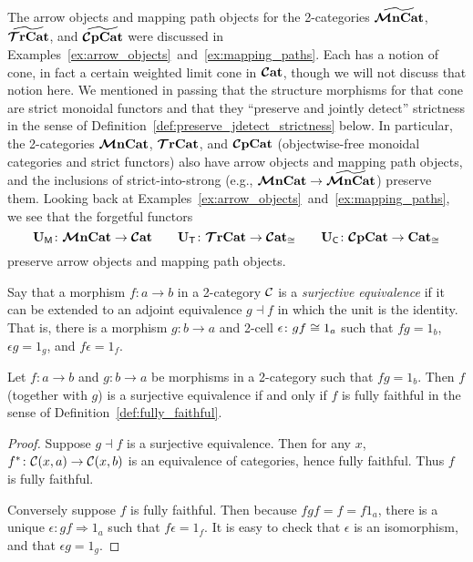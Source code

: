 \documentclass[11pt,oneside,article]{memoir}
\begin{document}
\begin{remark}
      \label{rem:pres_joint_detect}
   The arrow objects and mapping path objects for the 2-categories $\widetilde{\bm{\mathcal{M}}\mathbf{nCat}}$,
   $\widetilde{\bm{\mathcal{T}}\mathbf{rCat}}$, and $\widetilde{\bm{\mathcal{C}}\mathbf{pCat}}$ were discussed in
   Examples~\ref{ex:arrow_objects}~and~\ref{ex:mapping_paths}. Each has a notion of cone, in fact a
   certain weighted limit cone in $\bm{\mathcal{C}}\mathbf{at}$, though we will not discuss that notion here. We mentioned
   in passing that the structure morphisms for that cone are strict monoidal functors and that they
   ``preserve and jointly detect'' strictness in the sense of
   Definition~\ref{def:preserve_jdetect_strictness} below. In particular, the 2-categories
   $\bm{\mathcal{M}}\mathbf{nCat}$, $\bm{\mathcal{T}}\mathbf{rCat}$, and $\bm{\mathcal{C}}\mathbf{pCat}$ (objectwise-free monoidal categories and strict functors) also have arrow objects and mapping path objects, and the
   inclusions of strict-into-strong (e.g., $\bm{\mathcal{M}}\mathbf{nCat}\to\widetilde{\bm{\mathcal{M}}\mathbf{nCat}}$) preserve them. Looking back
   at Examples~\ref{ex:arrow_objects}~and~\ref{ex:mapping_paths}, we see that the forgetful functors
   \[
      \mathbf{U}_{\mathsf{M}}\colon\bm{\mathcal{M}}\mathbf{nCat}\to\bm{\mathcal{C}}\mathbf{at}
         \qquad
      \mathbf{U}_{\mathsf{T}}\colon\bm{\mathcal{T}}\mathbf{rCat}\to\bm{\mathcal{C}}\mathbf{at}_{\cong}
         \qquad
      \mathbf{U}_{\mathsf{C}}\colon\bm{\mathcal{C}}\mathbf{pCat}\to\mathbf{Cat}_{\cong}
   \]
   preserve arrow objects and mapping path objects.
\end{remark}

\begin{definition}
      \label{def:surjective_equivalence}
   Say that a morphism $f\colon a\to b$ in a 2-category $\mathcal{C}$ is a \emph{surjective
   equivalence} if it can be extended to an adjoint equivalence $g\dashv f$ in which the unit is the
   identity. That is, there is a morphism $g\colon b\to a$ and 2-cell $\epsilon\colon gf\cong 1_a$
   such that $fg=1_b$, $\epsilon g=1_g$, and $f\epsilon=1_f$.
\end{definition}

\begin{lemma}
      \label{lem:fully_faithful_surjective_equiv}
   Let $f\colon a\to b$ and $g\colon b\to a$ be morphisms in a 2-category such that $fg=1_b$. Then
   $f$ (together with $g$) is a surjective equivalence if and only if $f$ is fully faithful in the
   sense of Definition~\ref{def:fully_faithful}.
\end{lemma}
\begin{proof}
   Suppose $g\dashv f$ is a surjective equivalence. Then for any $x$,
   $f^*\colon\mathcal{C}(x,a)\to\mathcal{C}(x,b)$ is an equivalence of categories, hence fully faithful.
   Thus $f$ is fully faithful.

   Conversely suppose $f$ is fully faithful. Then because $fgf=f=f 1_a$, there is a unique
   $\epsilon\colon gf\Rightarrow 1_a$ such that $f\epsilon=1_f$. It is easy to check that $\epsilon$
   is an isomorphism, and that $\epsilon g=1_g$.
\end{proof}
\end{document}
